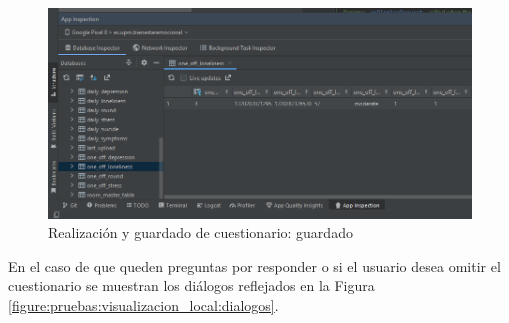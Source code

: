             \begin{figure}[h]
                \centering
                \includegraphics[width=1\textwidth]{figures/pruebas/realizacion_cuestionario/Guardado.png}
                \caption{Realización y guardado de cuestionario: guardado}
                \label{figure:pruebas:realizacion_cuestionario:guardado}
            \end{figure}

            En el caso de que queden preguntas por responder o si el usuario desea omitir el cuestionario se muestran los diálogos reflejados en la Figura \ref{figure:pruebas:visualizacion_local:dialogos}.

